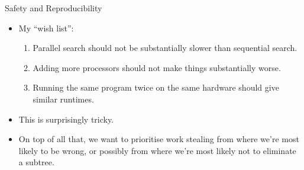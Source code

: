 \documentclass{beamer}
\begin{document}
\begin{frame}{Safety and Reproducibility}

    \begin{itemize}
        \item My ``wish list'':
            \begin{enumerate}
                \item Parallel search should not be substantially slower than sequential search.
                \item Adding more processors should not make things substantially worse.
                \item Running the same program twice on the same hardware should give similar
                    runtimes.
            \end{enumerate}
        \item This is surprisingly tricky.
        \item On top of all that, we want to prioritise work stealing from where we're most likely
            to be wrong, or possibly from where we're most likely not to eliminate a subtree.
    \end{itemize}

\end{frame}
\end{document}
